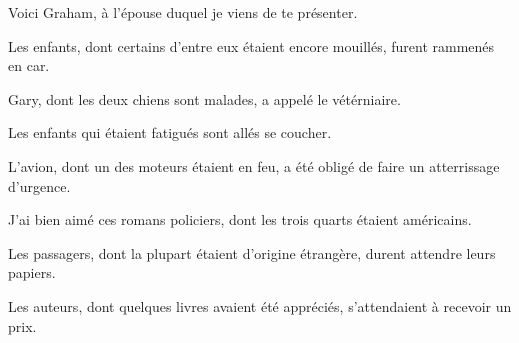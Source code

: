 \documentclass[a4paper,english,bookmarks]{article}
\begin{document}
\begin{enumerate}
\begin{minipage}{0.48\linewidth}
    	
    	\item Voici Graham, à l'épouse duquel je viens de te présenter.
    	
    	
    	\item Les enfants, dont certains d'entre eux étaient encore mouillés, furent rammenés en car.
    	
    	
    	\item Gary, dont les deux chiens sont malades, a appelé le vétérniaire.
    	
    \end{minipage}
    \hfill
    \begin{minipage}{0.48\linewidth}
    	\item Les enfants qui étaient fatigués sont allés se coucher.
    	
    	
    	\item L'avion, dont un des moteurs étaient en feu, a été obligé de faire un atterrissage d'urgence.
    	
    	
    	\item J'ai bien aimé ces romans policiers, dont les trois quarts étaient américains.
    	
    	
    	\item Les passagers, dont la plupart étaient d'origine étrangère, durent attendre leurs papiers.
    	
    	
    	\item Les auteurs, dont quelques livres avaient été appréciés, s'attendaient à recevoir un prix.
    	

\end{minipage}
\end{enumerate}
\end{document}
